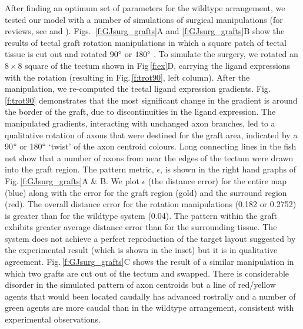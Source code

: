 \documentclass[11pt, a4paper]{article}
\begin{document}
After finding an optimum set of parameters for the wildtype arrangement, we tested our model with a number of simulations of surgical manipulations (for reviews, see \citet{udin_formation_1988} and \citet{goodhill_retinotectal_1999}). 
Figs.~\ref{f:GJsurg_grafts}A and \ref{f:GJsurg_grafts}B show the results of tectal graft rotation manipulations in which a square patch of tectal tissue is cut out and rotated $90\degree$ or $180\degree$ \citep{chung_observations_1978}. 
%
To simulate the surgery, we rotated an $8\times8$ square of the tectum shown in Fig\,\ref{f:ex}D, carrying the ligand expressions with the rotation (resulting in Fig.\,\ref{f:trot90}, left column). 
After the manipulation, we re-computed the tectal ligand expression gradients. Fig.\,\ref{f:trot90} demonstrates that the most significant change in the gradient is around the border of the graft, due to discontinuities in the ligand expression. 
The manipulated gradients, interacting with unchanged axon branches, led to a qualitative rotation of axons that were destined for the graft area, indicated by a 90$\degree$ or 180$\degree$ `twist' of the axon centroid colours. 
Long connecting lines in the fish net show that a number of axons from near the edges of the tectum were drawn into the graft region. 
The pattern metric, $\epsilon$, is shown in the right hand graphs of Fig.\,\ref{f:GJsurg_grafts}A \& B. 
We plot $\epsilon$ (the distance error) for the entire map (blue) along with the error for the graft region (gold) and the surround region (red). 
The overall distance error for the rotation manipulations (0.182 or 0.2752)  is greater than for the wildtype system (0.04). 
The pattern within the graft exhibits greater average distance error than for the surrounding tissue.
The system does not achieve a perfect reproduction of the target layout suggested by the experimental result (which is shown in the inset) but it is in qualitative agreement.
%
Fig.\,\ref{f:GJsurg_grafts}C shows the result of a similar manipulation in which two grafts are cut out of the tectum and swapped. 
There is considerable disorder in the simulated pattern of axon centroids but a line of red/yellow agents that would been located caudally has advanced rostrally and a number of green agents are more caudal than in the wildtype arrangement, consistent with experimental observations.
\end{document}
